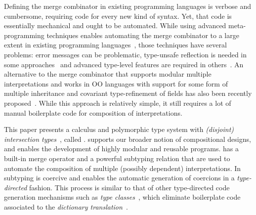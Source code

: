 
Defining the merge combinator in existing
programming languages is verbose and cumbersome, requiring code for every
new kind of syntax. Yet, that code is essentially mechanical and ought to be
automated. 
While using advanced meta-programming techniques enables automating
the merge combinator to a large extent in existing programming
languages~\cite{oliveira2013feature, rendel14attributes}, those techniques have
several problems: error messages can be problematic, type-unsafe reflection
is needed in some approaches~\cite{oliveira2013feature} and
advanced type-level features are required in others~\cite{rendel14attributes}.
An alternative to the merge combinator that supports modular multiple
interpretations and works in OO languages with
support for some form of multiple inheritance and covariant
type-refinement of fields has also been recently
proposed~\cite{zhang19shallow}. 
While this approach is relatively simple, it still
requires a lot of manual boilerplate code for composition of interpretations.

This paper presents a calculus and polymorphic type system with
\emph{(disjoint) intersection types}~\cite{oliveira2016disjoint},
called \fnamee. \fnamee
supports our broader notion of compositional designs, and enables
the development of highly modular and reusable programs. \fnamee
has a built-in merge operator and a powerful subtyping relation that
are used to automate the composition of multiple (possibly dependent)
interpretations. In \fnamee subtyping is coercive and enables the
automatic generation of coercions in a \emph{type-directed} fashion. 
This process is similar to that of other type-directed code generation mechanisms
such as 
\emph{type classes}~\cite{Wadler89typeclasses}, which eliminate 
boilerplate code associated to the \emph{dictionary translation}~\cite{Wadler89typeclasses}.

